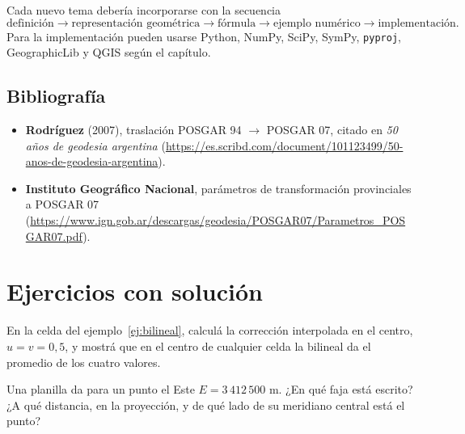 \begin{idea}
Cada nuevo tema debería incorporarse con la secuencia
\[
\text{definición}\rightarrow
\text{representación geométrica}\rightarrow
\text{fórmula}\rightarrow
\text{ejemplo numérico}\rightarrow
\text{implementación}.
\]
Para la implementación pueden usarse Python, NumPy, SciPy, SymPy, \texttt{pyproj},
GeographicLib y QGIS según el capítulo.
\end{idea}

\subsection{Bibliografía}

\begin{itemize}
  \item \textbf{Rodríguez} (2007), traslación POSGAR 94 \(\to\) POSGAR 07, citado en \emph{50 años de geodesia argentina} (\url{https://es.scribd.com/document/101123499/50-anos-de-geodesia-argentina}).
  \item \textbf{Instituto Geográfico Nacional}, parámetros de transformación provinciales a POSGAR 07
  (\url{https://www.ign.gob.ar/descargas/geodesia/POSGAR07/Parametros_POSGAR07.pdf}).
\end{itemize}

\section{Ejercicios con solución}

\begin{ejercicio}\label{ex:bilineal-centro}
En la celda del ejemplo~\ref{ej:bilineal}, calculá la corrección interpolada en el centro,
\(u=v=0{,}5\), y mostrá que en el centro de cualquier celda la bilineal da el promedio de los
cuatro valores.
\end{ejercicio}

\begin{ejercicio}\label{ex:faja-este}
Una planilla da para un punto el Este \(E=3\,412\,500\) m. ¿En qué faja está escrito? ¿A qué
distancia, en la proyección, y de qué lado de su meridiano central está el punto?
\end{ejercicio}

